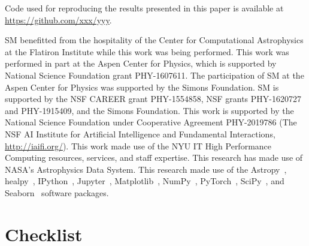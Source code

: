 \documentclass[]{article}
\begin{document}
Code used for reproducing the results presented in this paper is available at \url{https://github.com/xxx/yyy}. 

\begin{ack}
SM benefitted from the hospitality of the Center for Computational Astrophysics at the Flatiron Institute while this work was being performed. 
This work was performed in part at the Aspen Center for Physics, which is supported by National Science Foundation grant PHY-1607611.
The participation of SM at the Aspen Center for Physics was supported by the Simons Foundation.
SM is supported by the NSF CAREER grant PHY-1554858, NSF grants PHY-1620727 and PHY-1915409, and the Simons Foundation. 
This work is supported by the National Science Foundation under Cooperative Agreement PHY-2019786 (The NSF AI Institute for Artificial Intelligence and Fundamental Interactions, \url{http://iaifi.org/}).
This work made use of the NYU IT High Performance Computing resources, services, and staff expertise. 
This research has made use of NASA's Astrophysics Data System. 
This research made use of the Astropy~\cite{Robitaille:2013mpa,Price-Whelan:2018hus},
healpy~\cite{Gorski:2004by,Zonca2019},
IPython~\cite{PER-GRA:2007},
Jupyter~\cite{Kluyver2016JupyterN},
Matplotlib~\cite{Hunter:2007},
NumPy~\cite{harris_array_2020},
PyTorch~\cite{NEURIPS2019_9015},
SciPy~\cite{2020SciPy-NMeth}, and
Seaborn~\cite{michael_waskom_2017_883859}
software packages.
\end{ack}



{
\small

}

\section*{Checklist}
\end{document}
